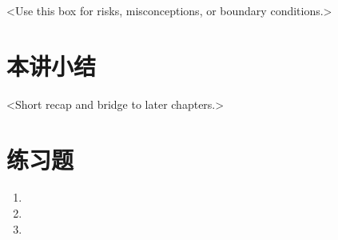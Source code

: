 \documentclass[11pt,a4paper]{article}
\begin{document}
\begin{warnbox}
<Use this box for risks, misconceptions, or boundary conditions.>
\end{warnbox}

\section{本讲小结}

<Short recap and bridge to later chapters.>

\section{练习题}

\begin{enumerate}
  \item <Question 1>
  \item <Question 2>
  \item <Question 3>
\end{enumerate}
\end{document}
